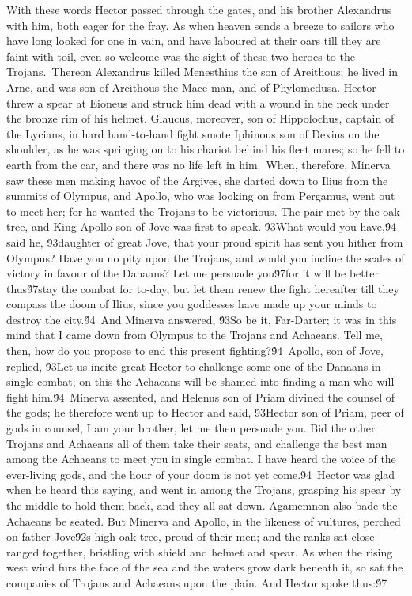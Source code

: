 {  With these words Hector passed through the gates, and his brother Alexandrus with him, both eager for the fray. As when heaven sends a breeze to sailors who have long looked for one in vain, and have laboured at their oars till they are faint with toil, even so welcome was the sight of these two heroes to the Trojans.\
Thereon Alexandrus killed Menesthius the son of Areithous; he lived in Arne, and was son of Areithous the Mace-man, and of Phylomedusa. Hector threw a spear at Eioneus and struck him dead with a wound in the neck under the bronze rim of his helmet. Glaucus, moreover, son of Hippolochus, captain of the Lycians, in hard hand-to-hand fight smote Iphinous son of Dexius on the shoulder, as he was springing on to his chariot behind his fleet mares; so he fell to earth from the car, and there was no life left in him.\
When, therefore, Minerva saw these men making havoc of the Argives, she darted down to Ilius from the summits of Olympus, and Apollo, who was looking on from Pergamus, went out to meet her; for he wanted the Trojans to be victorious. The pair met by the oak tree, and King Apollo son of Jove was first to speak. \'93What would you have,\'94 said he, \'93daughter of great Jove, that your proud spirit has sent you hither from Olympus? Have you no pity upon the Trojans, and would you incline the scales of victory in favour of the Danaans? Let me persuade you\'97for it will be better thus\'97stay the combat for to-day, but let them renew the fight hereafter till they compass the doom of Ilius, since you goddesses have made up your minds to destroy the city.\'94\
And Minerva answered, \'93So be it, Far-Darter; it was in this mind that I came down from Olympus to the Trojans and Achaeans. Tell me, then, how do you propose to end this present fighting?\'94\
Apollo, son of Jove, replied, \'93Let us incite great Hector to challenge some one of the Danaans in single combat; on this the Achaeans will be shamed into finding a man who will fight him.\'94\
Minerva assented, and Helenus son of Priam divined the counsel of the gods; he therefore went up to Hector and said, \'93Hector son of Priam, peer of gods in counsel, I am your brother, let me then persuade you. Bid the other Trojans and Achaeans all of them take their seats, and challenge the best man among the Achaeans to meet you in single combat. I have heard the voice of the ever-living gods, and the hour of your doom is not yet come.\'94\
Hector was glad when he heard this saying, and went in among the Trojans, grasping his spear by the middle to hold them back, and they all sat down. Agamemnon also bade the Achaeans be seated. But Minerva and Apollo, in the likeness of vultures, perched on father Jove\'92s high oak tree, proud of their men; and the ranks sat close ranged together, bristling with shield and helmet and spear. As when the rising west wind furs the face of the sea and the waters grow dark beneath it, so sat the companies of Trojans and Achaeans upon the plain. And Hector spoke thus:\'97\
}
